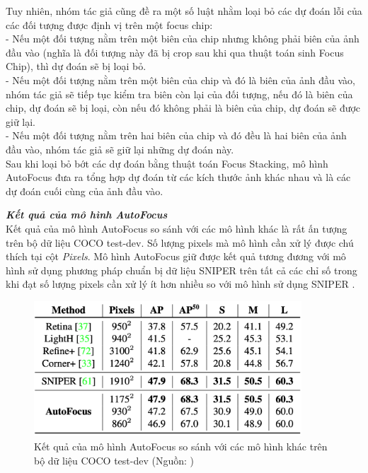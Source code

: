 {    \noindent
    Tuy nhiên, nhóm tác giả cũng đề ra một số luật nhằm loại bỏ các dự đoán lỗi của các đối tượng được định vị trên một focus chip: \\
    - Nếu một đối tượng nằm trên một biên của chip nhưng không phải biên của ảnh đầu vào (nghĩa là đối tượng này đã bị crop sau khi qua thuật toán sinh Focus Chip), thì dự đoán sẽ bị loại bỏ. \\
    - Nếu một đối tượng nằm trên một biên của chip và đó là biên của ảnh đầu vào, nhóm tác giả sẽ tiếp tục kiểm tra biên còn lại của đối tượng, nếu đó là biên của chip, dự đoán sẽ bị loại, còn nếu đó không phải là biên của chip, dự đoán sẽ được giữ lại. \\
    - Nếu một đối tượng nằm trên hai biên của chip và đó đều là hai biên của ảnh đầu vào, nhóm tác giả sẽ giữ lại những dự đoán này. \\
    Sau khi loại bỏ bớt các dự đoán bằng thuật toán Focus Stacking, mô hình AutoFocus đưa ra tổng hợp dự đoán từ các kích thước ảnh khác nhau và là các dự đoán cuối cùng của ảnh đầu vào.

    \noindent
    \textbf{\textit{Kết quả của mô hình AutoFocus}} \\
    Kết quả của mô hình AutoFocus so sánh với các mô hình khác là rất ấn tượng trên bộ dữ liệu COCO test-dev.
    Số lượng pixels  mà mô hình cần xử lý được chú thích tại cột \textit{Pixels}.
    Mô hình AutoFocus giữ được kết quả tương đương với mô hình sử dụng phương pháp chuẩn bị dữ liệu SNIPER  trên tất cả các chỉ số trong khi đạt số lượng pixels  cần xử lý ít hơn nhiều so với mô hình sử dụng SNIPER .

    \begin{figure}[H]
        \centering
        \includegraphics[width=10cm] {images/autofocus_results_1}
        \caption{Kết quả của mô hình AutoFocus so sánh với các mô hình khác trên bộ dữ liệu COCO test-dev (Nguồn: \cite{najibi2019autofocus})}
        \label{fig:autofocus_results_1}
    \end{figure}

}
